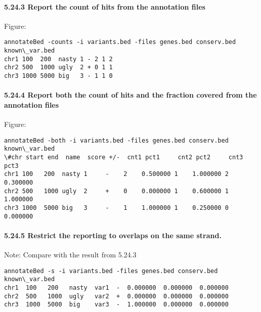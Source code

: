 \documentclass[letterpaper,10pt,english]{sphinxmanual}
\begin{document}
\paragraph{5.24.3 Report the count of hits from the annotation files}
\label{content/annotateBed:report-the-count-of-hits-from-the-annotation-files}
Figure:

\begin{Verbatim}[commandchars=\\\{\}]
annotateBed -counts -i variants.bed -files genes.bed conserv.bed known\_var.bed
chr1 100  200  nasty 1 - 2 1 2
chr2 500  1000 ugly  2 + 0 1 1
chr3 1000 5000 big   3 - 1 1 0
\end{Verbatim}


\paragraph{5.24.4 Report both the count of hits and the fraction covered from the annotation files}
\label{content/annotateBed:report-both-the-count-of-hits-and-the-fraction-covered-from-the-annotation-files}
Figure:

\begin{Verbatim}[commandchars=\\\{\}]
annotateBed -both -i variants.bed -files genes.bed conserv.bed known\_var.bed
\#chr start end  name  score +/-  cnt1 pct1     cnt2 pct2     cnt3 pct3
chr1 100   200  nasty 1     -    2    0.500000 1    1.000000 2    0.300000
chr2 500   1000 ugly  2     +    0    0.000000 1    0.600000 1    1.000000
chr3 1000  5000 big   3     -    1    1.000000 1    0.250000 0    0.000000
\end{Verbatim}


\paragraph{5.24.5 Restrict the reporting to overlaps on the same strand.}
\label{content/annotateBed:restrict-the-reporting-to-overlaps-on-the-same-strand}
Note: Compare with the result from 5.24.3

\begin{Verbatim}[commandchars=\\\{\}]
annotateBed -s -i variants.bed -files genes.bed conserv.bed known\_var.bed
chr1  100   200   nasty  var1  -  0.000000  0.000000  0.000000
chr2  500   1000  ugly   var2  +  0.000000  0.000000  0.000000
chr3  1000  5000  big    var3  -  1.000000  0.000000  0.000000
\end{Verbatim}
\end{document}
